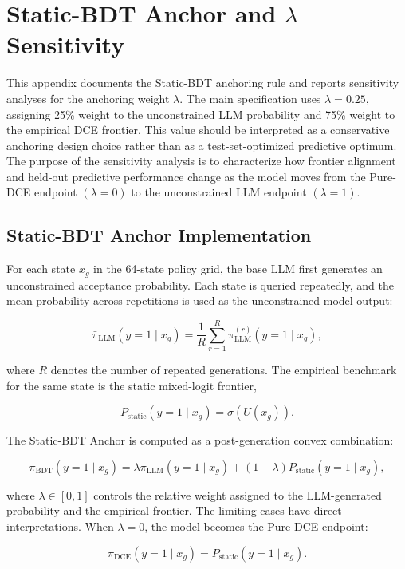 \documentclass[11pt]{article}
\begin{document}
\section{Static-BDT Anchor and \texorpdfstring{\(\lambda\)}{lambda} Sensitivity}
\label{app:lambda}

This appendix documents the Static-BDT anchoring rule and reports sensitivity analyses for the anchoring weight \(\lambda\). The main specification uses \(\lambda=0.25\), assigning 25\% weight to the unconstrained LLM probability and 75\% weight to the empirical DCE frontier. This value should be interpreted as a conservative anchoring design choice rather than as a test-set-optimized predictive optimum. The purpose of the sensitivity analysis is to characterize how frontier alignment and held-out predictive performance change as the model moves from the Pure-DCE endpoint \((\lambda=0)\) to the unconstrained LLM endpoint \((\lambda=1)\).

\subsection{Static-BDT Anchor Implementation}

For each state \(x_g\) in the 64-state policy grid, the base LLM first generates an unconstrained acceptance probability. Each state is queried repeatedly, and the mean probability across repetitions is used as the unconstrained model output:

\[
\bar{\pi}_{\mathrm{LLM}}(y=1 \mid x_g)
=
\frac{1}{R}
\sum_{r=1}^{R}
\pi_{\mathrm{LLM}}^{(r)}(y=1 \mid x_g),
\]

where \(R\) denotes the number of repeated generations. The empirical benchmark for the same state is the static mixed-logit frontier,

\[
P_{\mathrm{static}}(y=1 \mid x_g)
=
\sigma(U(x_g)).
\]

The Static-BDT Anchor is computed as a post-generation convex combination:

\[
\pi_{\mathrm{BDT}}(y=1 \mid x_g)
=
\lambda \bar{\pi}_{\mathrm{LLM}}(y=1 \mid x_g)
+
(1-\lambda)P_{\mathrm{static}}(y=1 \mid x_g),
\]

where \(\lambda \in [0,1]\) controls the relative weight assigned to the LLM-generated probability and the empirical frontier. The limiting cases have direct interpretations. When \(\lambda=0\), the model becomes the Pure-DCE endpoint:

\[
\pi_{\mathrm{DCE}}(y=1 \mid x_g)
=
P_{\mathrm{static}}(y=1 \mid x_g).
\]
\end{document}
